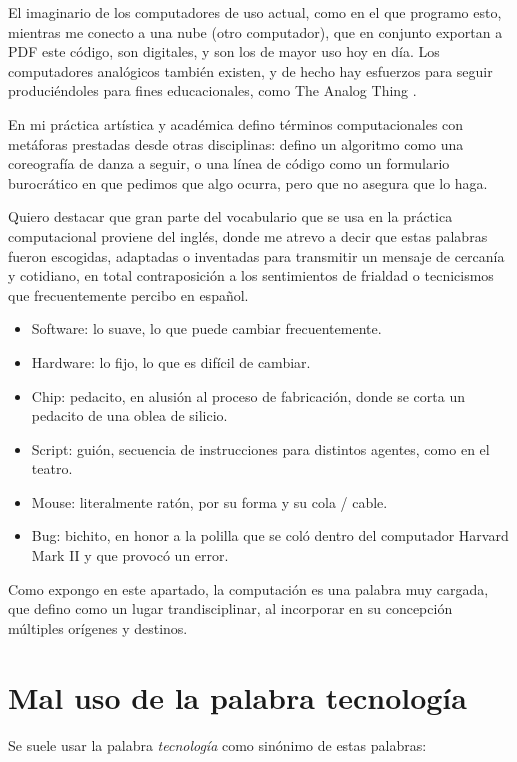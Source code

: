 \documentclass{article}
\begin{document}
El imaginario de los computadores de uso actual, como en el que programo esto, mientras me conecto a una nube (otro computador), que en conjunto exportan a PDF este código, son digitales, y son los de mayor uso hoy en día. Los computadores analógicos también existen, y de hecho hay esfuerzos para seguir produciéndoles para fines educacionales, como The Analog Thing \cite{analogThing}.

En mi práctica artística y académica defino términos computacionales con metáforas prestadas desde otras disciplinas: defino un algoritmo como una coreografía de danza a seguir, o una línea de código como un formulario burocrático en que pedimos que algo ocurra, pero que no asegura que lo haga.

Quiero destacar que gran parte del vocabulario que se usa en la práctica computacional proviene del inglés, donde me atrevo a decir que estas palabras fueron escogidas, adaptadas o inventadas para transmitir un mensaje de cercanía y cotidiano, en total contraposición a los sentimientos de frialdad o tecnicismos que frecuentemente percibo en español.

\begin{itemize}
    \item Software: lo suave, lo que puede cambiar frecuentemente.
    \item Hardware: lo fijo, lo que es difícil de cambiar.
    \item Chip: pedacito, en alusión al proceso de fabricación, donde se corta un pedacito de una oblea de silicio.
    \item Script: guión, secuencia de instrucciones para distintos agentes, como en el teatro.
    \item Mouse: literalmente ratón, por su forma y su cola / cable.
    \item Bug: bichito, en honor a la polilla que se coló dentro del computador Harvard Mark II y que provocó un error.
\end{itemize}

Como expongo en este apartado, la computación es una palabra muy cargada, que defino como un lugar trandisciplinar, al incorporar en su concepción múltiples orígenes y destinos.

\clearpage

\section{Mal uso de la palabra tecnología}

Se suele usar la palabra \textit{tecnología} como sinónimo de estas palabras:
\end{document}
